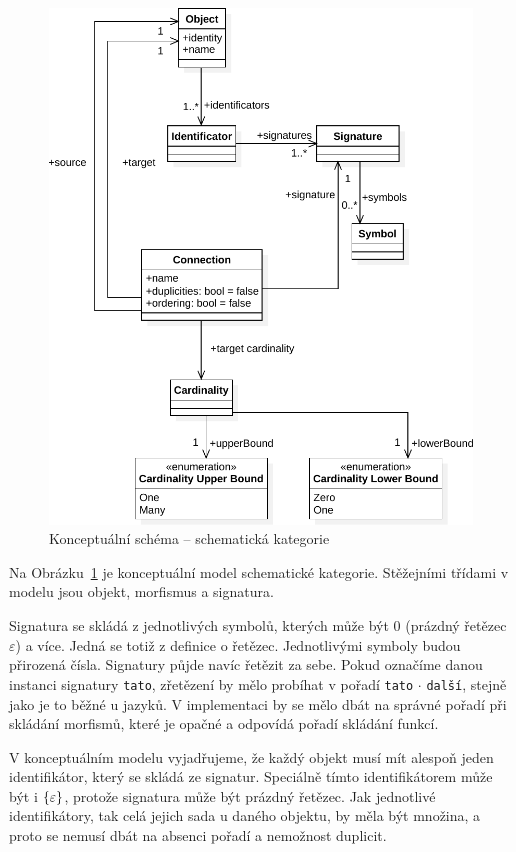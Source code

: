 \begin{figure}[!htb]
  \centering
  \includegraphics[width=\maxwidth{\textwidth}]{../img/diagrams/schema-category-model.pdf}
  \caption{Konceptuální schéma -- schematická kategorie}
  \label{fig:class-diagram:schemcat}
\end{figure}

Na Obrázku~\ref{fig:class-diagram:schemcat} je konceptuální model schematické kategorie.
Stěžejními třídami v modelu jsou objekt, morfismus a signatura.

Signatura se skládá z jednotlivých symbolů, kterých může být 0 (prázdný řetězec $\varepsilon$) a více.
Jedná se totiž z definice o řetězec.
Jednotlivými symboly budou přirozená čísla.
Signatury půjde navíc řetězit za sebe.
Pokud označíme danou instanci signatury \texttt{tato}, zřetězení by mělo probíhat v pořadí \texttt{tato} $\cdot$ \texttt{další}, stejně jako je to běžné u jazyků.
V implementaci by se mělo dbát na správné pořadí při skládání morfismů, které je opačné a odpovídá pořadí skládání funkcí.

V konceptuálním modelu vyjadřujeme, že každý objekt musí mít alespoň jeden identifikátor, který se skládá ze signatur.
Speciálně tímto identifikátorem může být i $\left\{\varepsilon\right\}$, protože signatura může být prázdný řetězec.
Jak jednotlivé identifikátory, tak celá jejich sada u daného objektu, by měla být množina, a proto se nemusí dbát na absenci pořadí a nemožnost duplicit.

